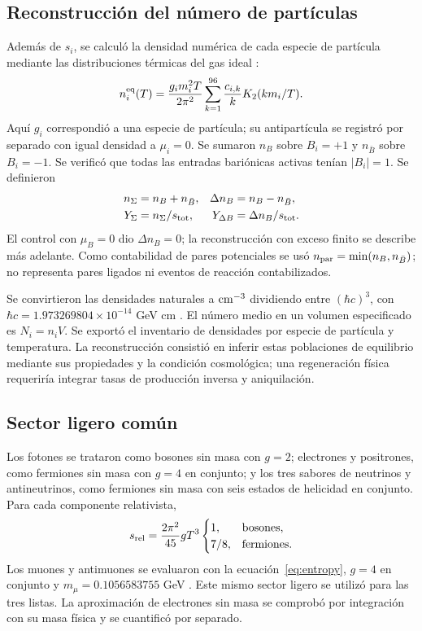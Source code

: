 \subsection{Reconstrucción del número de partículas}
Además de $s_i$, se calculó la densidad numérica de cada especie de partícula mediante las distribuciones térmicas del gas ideal \citep{Vovchenko2019}:
\begin{equation}
n_i^{\rm eq}(T)=\frac{g_i m_i^2T}{2\pi^2}
\sum_{k=1}^{96}\frac{c_{i,k}}{k}K_2(km_i/T).
\label{eq:number}
\end{equation}
Aquí $g_i$ correspondió a una especie de partícula; su antipartícula se registró por separado con igual densidad a $\mu_i=0$. Se sumaron $n_B$ sobre $B_i=+1$ y $n_{\bar B}$ sobre $B_i=-1$. Se verificó que todas las entradas bariónicas activas tenían $|B_i|=1$. Se definieron
\begin{align}
n_\Sigma&=n_B+n_{\bar B}, & \Delta n_B&=n_B-n_{\bar B},\\
Y_\Sigma&=n_\Sigma/s_{\mathrm{tot}}, & Y_{\Delta B}&=\Delta n_B/s_{\mathrm{tot}}.
\label{eq:yields}
\end{align}
El control con $\mu_B=0$ dio $\Delta n_B=0$; la reconstrucción con exceso finito se describe más adelante. Como contabilidad de pares potenciales se usó $n_{\rm par}=\min(n_B,n_{\bar B})$; no representa pares ligados ni eventos de reacción contabilizados.

Se convirtieron las densidades naturales a ${\rm cm^{-3}}$ dividiendo entre $(\hbar c)^3$, con $\hbar c=1.973269804\times10^{-14}$ GeV cm \citep{Robinson2025}. El número medio en un volumen especificado es $N_i=n_iV$. Se exportó el inventario de densidades por especie de partícula y temperatura. La reconstrucción consistió en inferir estas poblaciones de equilibrio mediante sus propiedades y la condición cosmológica; una regeneración física requeriría integrar tasas de producción inversa y aniquilación.

\subsection{Sector ligero común}
Los fotones se trataron como bosones sin masa con $g=2$; electrones y positrones, como fermiones sin masa con $g=4$ en conjunto; y los tres sabores de neutrinos y antineutrinos, como fermiones sin masa con seis estados de helicidad en conjunto. Para cada componente relativista,
\begin{equation}
s_{\rm rel}=\frac{2\pi^2}{45}gT^3
\begin{cases}
1,&\text{bosones},\\
7/8,&\text{fermiones}.
\end{cases}
\end{equation}
Los muones y antimuones se evaluaron con la ecuación~\eqref{eq:entropy}, $g=4$ en conjunto y $m_\mu=0.1056583755$ GeV \citep{PDG2025}. Este mismo sector ligero se utilizó para las tres listas. La aproximación de electrones sin masa se comprobó por integración con su masa física y se cuantificó por separado.

